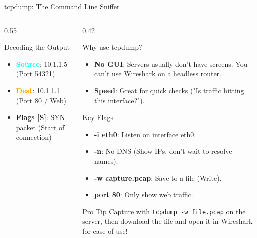 \documentclass[aspectratio=169]{beamer}  %
\begin{document}
\begin{frame}[fragile,t,shrink=14]{tcpdump: The Command Line Sniffer}
\begin{columns}[T]
\begin{column}{0.55\textwidth}
            \begin{block}{Decoding the Output}
                \footnotesize
                \begin{itemize}
                    \item \textcolor{cyan}{\textbf{Source}}: 10.1.1.5 (Port 54321)
                    \item \textcolor{orange}{\textbf{Dest}}: 10.1.1.1 (Port 80 / Web)
                    \item \textbf{Flags [S]}: SYN packet (Start of connection)
                \end{itemize}
            \end{block}
        \end{column}
        \begin{column}{0.42\textwidth}
            \begin{block}{Why use tcpdump?}
                \footnotesize
                \begin{itemize}
                    \item \textbf{No GUI}: Servers usually don't have screens. You can't use Wireshark on a headless router.
                    \item \textbf{Speed}: Great for quick checks ("Is traffic hitting this interface?").
                \end{itemize}
            \end{block}
            \begin{exampleblock}{Key Flags}
                \footnotesize
                \begin{itemize}
                    \item \textbf{-i eth0}: Listen on interface eth0.
                    \item \textbf{-n}: No DNS (Show IPs, don't wait to resolve names).
                    \item \textbf{-w capture.pcap}: Save to a file (Write).
                    \item \textbf{port 80}: Only show web traffic.
                \end{itemize}
            \end{exampleblock}
            \begin{alertblock}{Pro Tip}
                \footnotesize
                Capture with \texttt{tcpdump -w file.pcap} on the server, then download the file and open it in Wireshark for ease of use!
            \end{alertblock}
        \end{column}
    \end{columns}
\end{frame}
\end{document}
